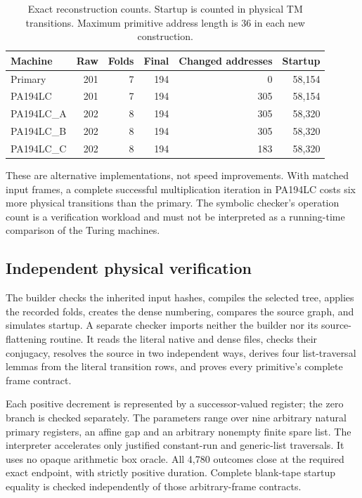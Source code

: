 \documentclass[11pt,a4paper]{article}
\begin{document}
\begin{table}[ht]
\centering\small
\begin{tabular}{@{}lrrrrr@{}}
\toprule
Machine & Raw & Folds & Final & Changed addresses & Startup\\
\midrule
Primary & 201 & 7 & 194 & 0 & 58,154\\
PA194LC & 201 & 7 & 194 & 305 & 58,154\\
PA194LC\_A & 202 & 8 & 194 & 305 & 58,320\\
PA194LC\_B & 202 & 8 & 194 & 305 & 58,320\\
PA194LC\_C & 202 & 8 & 194 & 183 & 58,320\\
\bottomrule
\end{tabular}
\caption{Exact reconstruction counts. Startup is counted in physical TM transitions. Maximum primitive address length is 36 in each new construction.}
\end{table}

These are alternative implementations, not speed improvements. With
matched input frames, a complete successful multiplication iteration in
PA194LC costs six more physical transitions than the primary. The
symbolic checker's operation count is a verification workload and must
not be interpreted as a running-time comparison of the Turing machines.

\subsection{Independent physical verification}

The builder checks the inherited input hashes, compiles the selected tree,
applies the recorded folds, creates the dense numbering, compares the
source graph, and simulates startup. A separate checker imports neither
the builder nor its source-flattening routine. It reads the literal
native and dense files, checks their conjugacy, resolves the source in two
independent ways, derives four list-traversal lemmas from the literal
transition rows, and proves every primitive's complete frame contract.

Each positive decrement is represented by a successor-valued register;
the zero branch is checked separately. The parameters range over nine
arbitrary natural primary registers, an affine gap and an arbitrary
nonempty finite spare list. The interpreter accelerates only justified
constant-run and generic-list traversals. It uses no opaque arithmetic
box oracle. All 4,780 outcomes close at the required exact endpoint,
with strictly positive duration. Complete blank-tape startup equality is
checked independently of those arbitrary-frame contracts.
\end{document}
